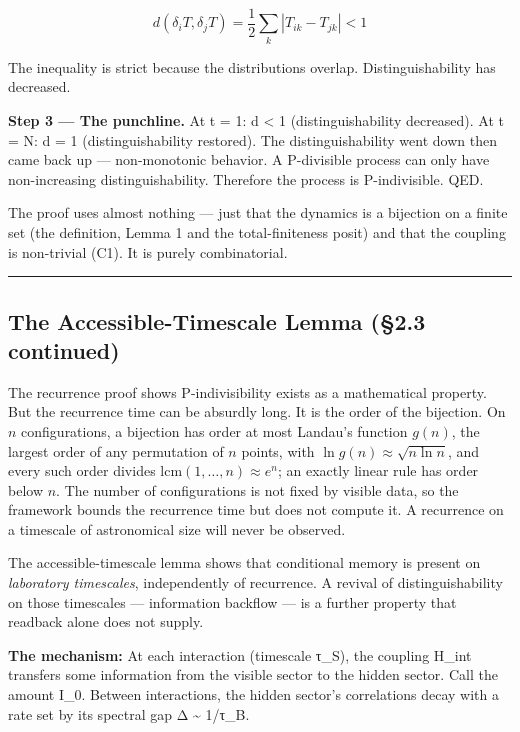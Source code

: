 \documentclass[
]{article}
\begin{document}
\[d(\delta_i T, \delta_j T) = \frac{1}{2}\sum_k |T_{ik} - T_{jk}| < 1\]

The inequality is strict because the distributions overlap.
Distinguishability has decreased.

\textbf{Step 3 --- The punchline.} At t = 1: d \textless{} 1
(distinguishability decreased). At t = N: d = 1 (distinguishability
restored). The distinguishability went down then came back up ---
non-monotonic behavior. A P-divisible process can only have
non-increasing distinguishability. Therefore the process is
P-indivisible. QED.

The proof uses almost nothing --- just that the dynamics is a bijection
on a finite set (the definition, Lemma 1 and the total-finiteness posit)
and that the coupling is non-trivial (C1). It is purely combinatorial.

\begin{center}\rule{0.5\linewidth}{0.5pt}\end{center}

\hypertarget{the-accessible-timescale-lemma-2.3-continued}{%
\subsection{The Accessible-Timescale Lemma (§2.3
continued)}\label{the-accessible-timescale-lemma-2.3-continued}}

The recurrence proof shows P-indivisibility exists as a mathematical
property. But the recurrence time can be absurdly long. It is the order
of the bijection. On \(n\) configurations, a bijection has order at most
Landau's function \(g(n)\), the largest order of any permutation of
\(n\) points, with \(\ln g(n) \approx \sqrt{n \ln n}\), and every such
order divides \(\mathrm{lcm}(1, \ldots, n) \approx e^n\); an exactly
linear rule has order below \(n\). The number of configurations is not
fixed by visible data, so the framework bounds the recurrence time but
does not compute it. A recurrence on a timescale of astronomical size
will never be observed.

The accessible-timescale lemma shows that conditional memory is present
on \emph{laboratory timescales}, independently of recurrence. A revival
of distinguishability on those timescales --- information backflow ---
is a further property that readback alone does not supply.

\textbf{The mechanism:} At each interaction (timescale τ\_S), the
coupling H\_int transfers some information from the visible sector to
the hidden sector. Call the amount I\_0. Between interactions, the
hidden sector's correlations decay with a rate set by its spectral gap Δ
\textasciitilde{} 1/τ\_B.
\end{document}
